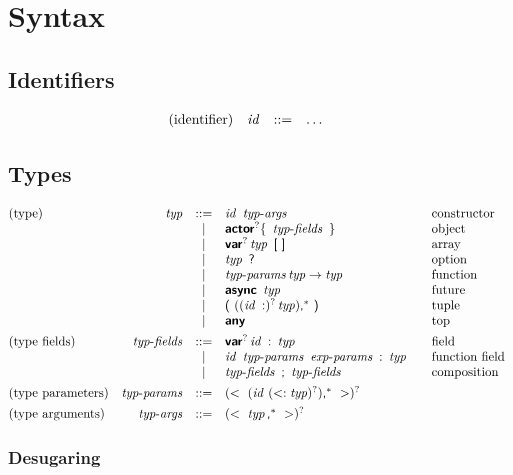 
\section{Syntax}

\subsection*{Identifiers}

$$
\begin{array}{@{}lrcl@{\qquad}l}
\text{(identifier)} & \x{id} &::=&
  \dots \\
\end{array}
$$


\subsection*{Types}

$$
\begin{array}{@{}lrcl@{\qquad}l}
\text{(type)} & \x{typ} &::=&
  \x{id}~\x{typ-args}
    & \text{constructor} \\&&|&
  \KK{actor}^? \K\{~\x{typ-fields}~\K\}
    & \text{object} \\&&|&
  \KK{var}^? \x{typ}~\K[~\K]
    & \text{array} \\&&|&
  \x{typ}~\K?
    & \text{option} \\&&|&
  \x{typ-params} \x{typ} \Kto \x{typ}
    & \text{function} \\&&|&
  \KK{async}~\x{typ}
    & \text{future} \\&&|&
  \K(~( (\x{id}~\K:)^? \x{typ})\K,^\ast~\K)
    & \text{tuple} \\&&|&
  \KK{any}
    & \text{top} \\
[1ex]
\text{(type fields)} & \x{typ-fields} &::=&
  \KK{var}^? \x{id}~\K:~\x{typ}
    & \text{field} \\&&|&
  \x{id}~\x{typ-params}~\x{exp-params}~\K:~\x{typ}
    & \text{function field} \\&&|&
  \x{typ-fields}~\K;~\x{typ-fields}
    & \text{composition} \\
[1ex]
\text{(type parameters)} & \x{typ-params} &::=&
  (\Klt~(\x{id}~(\Ksub \x{typ})^?)\K,^\ast~\Kgt)^? \\
[1ex]
\text{(type arguments)} & \x{typ-args} &::=&
  (\Klt~\x{typ}\K,^\ast~\Kgt)^? \\
\end{array}
$$

\subsubsection*{Desugaring}


